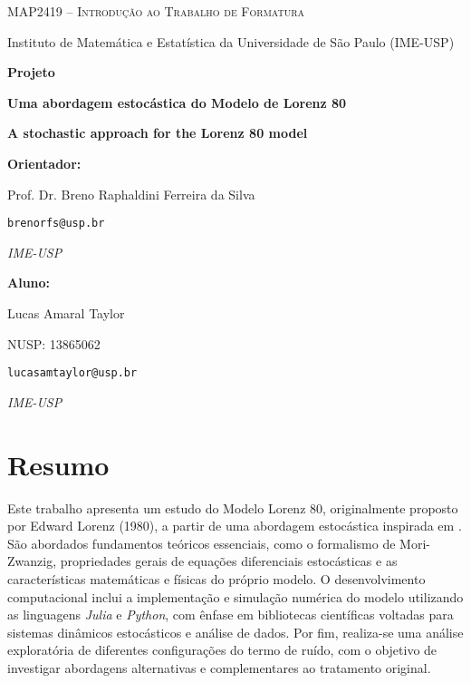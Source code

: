 \documentclass[12pt]{article}
\newenvironment{resumo}{
  \fontsize{10pt}{12pt}\selectfont  %
  \setstretch{1}                    %
  \par\noindent                     %
  \justifying                      %
}{
  \par
}
\begin{document}
\begin{titlepage}
	\centering
	{\Large\scshape MAP2419 -- Introdução ao Trabalho de Formatura \par}
	\vspace{0.3cm}
	{\large Instituto de Matemática e Estatística da Universidade de São Paulo (IME-USP)\par}
	    
	\vspace{3cm}
	    
	{\LARGE\bfseries Projeto\par}
	\vspace{1cm}
	{\LARGE\bfseries Uma abordagem estocástica do Modelo de Lorenz 80\par}
	\vspace{0.5em}
	{\large\bfseries A stochastic approach for the Lorenz 80 model\par}
	
	\vfill
	    
	\begin{minipage}[t]{0.45\textwidth}
		\raggedright
		\textbf{Orientador:} \par
		Prof. Dr. Breno Raphaldini Ferreira da Silva  \par
		\texttt{brenorfs@usp.br} \par
		\textit{IME-USP} \par\medskip
	\end{minipage}
	\hfill
	\begin{minipage}[t]{0.45\textwidth}
		\raggedright
		\textbf{Aluno:} \par
		Lucas Amaral Taylor \par
		NUSP: 13865062 \par
		\texttt{lucasamtaylor@usp.br} \par
		\textit{IME-USP}
	\end{minipage}
	\vspace{2cm}
\end{titlepage}

\newpage
\section*{Resumo}
\begin{resumo}
    Este trabalho apresenta um estudo do Modelo Lorenz 80, originalmente proposto por Edward Lorenz (1980), a partir de uma abordagem estocástica inspirada em \citet{Chekroun2021}. São abordados fundamentos teóricos essenciais, como o formalismo de Mori-Zwanzig, propriedades gerais de equações diferenciais estocásticas e as características matemáticas e físicas do próprio modelo. O desenvolvimento computacional inclui a implementação e simulação numérica do modelo utilizando as linguagens \textit{Julia} e \textit{Python}, com ênfase em bibliotecas científicas voltadas para sistemas dinâmicos estocásticos e análise de dados. Por fim, realiza-se uma análise exploratória de diferentes configurações do termo de ruído, com o objetivo de investigar abordagens alternativas e complementares ao tratamento original.
\end{resumo}
\end{document}
